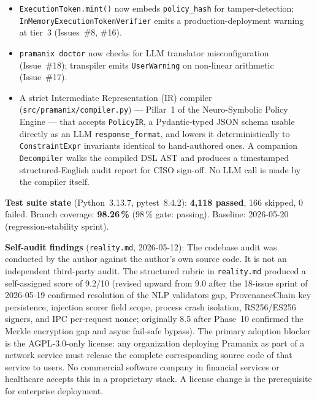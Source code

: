 \documentclass[12pt,a4paper,oneside]{report}
\newcommand{\fname}[1]{\texttt{#1}}          %
\newcommand{\code}[1]{\texttt{#1}}           %
\begin{document}
\begin{itemize}
        \code{SemanticSimilarityGuard}) in \fname{nlp/validators.py},
        exported via \code{pramanix.\_\_init\_\_}
        (18-issue sprint, Issue~\#2).
  \item \code{ExecutionToken.mint()} now embeds \code{policy\_hash} for
        tamper-detection; \code{InMemoryExecutionTokenVerifier} emits a
        production-deployment warning at tier~3 (Issues~\#8, \#16).
  \item \code{pramanix doctor} now checks for LLM translator
        misconfiguration (Issue~\#18); transpiler emits
        \code{UserWarning} on non-linear arithmetic (Issue~\#17).
  \item A strict Intermediate Representation (IR) compiler
        (\fname{src/pramanix/compiler.py}) --- Pillar~1 of the
        Neuro-Symbolic Policy Engine --- that accepts \code{PolicyIR}, a
        Pydantic-typed JSON schema usable directly as an LLM
        \code{response\_format}, and lowers it deterministically to
        \code{ConstraintExpr} invariants identical to hand-authored ones.
        A companion \code{Decompiler} walks the compiled DSL AST and
        produces a timestamped structured-English audit report for CISO
        sign-off.  No LLM call is made by the compiler itself.
\end{itemize}

\textbf{Test suite state} (Python~3.13.7, pytest~8.4.2): \textbf{4,118 passed},
166 skipped, 0 failed.  Branch coverage: \textbf{98.26\,\%} (98\,\% gate:
passing).  Baseline: 2026-05-20 (regression-stability sprint).

\textbf{Self-audit findings} (\fname{reality.md}, 2026-05-12): The codebase
audit was conducted by the author against the author's own source code.  It
is not an independent third-party audit.  The structured rubric in
\fname{reality.md} produced a self-assigned score of 9.2/10 (revised upward from
9.0 after the 18-issue sprint of 2026-05-19 confirmed resolution of the NLP
validators gap, ProvenanceChain key persistence, injection scorer field scope,
process crash isolation, RS256/ES256 signers, and IPC per-request nonce;
originally 8.5 after Phase~10 confirmed the Merkle encryption gap and async
fail-safe bypass).  The primary
adoption blocker is the AGPL-3.0-only license: any organization deploying
Pramanix as part of a network service must release the complete corresponding
source code of that service to users.  No commercial software company in
financial services or healthcare accepts this in a proprietary stack.  A
license change is the prerequisite for enterprise deployment.
\end{document}
